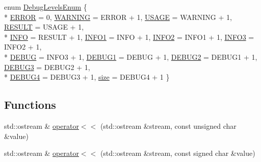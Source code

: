 \begin{DoxyCompactItemize}
\item 
enum \hyperlink{namespaceuva_1_1smt_1_1logging_ab82295a1c88a9605285d504893855427}{Debug\+Levels\+Enum} \{ \\*
\hyperlink{namespaceuva_1_1smt_1_1logging_ab82295a1c88a9605285d504893855427afe62f43ec1d0249d8c3a20e61911d469}{E\+R\+R\+O\+R} = 0, 
\hyperlink{namespaceuva_1_1smt_1_1logging_ab82295a1c88a9605285d504893855427a87b82af01a3dab361757373d1ac96254}{W\+A\+R\+N\+I\+N\+G} = E\+R\+R\+O\+R + 1, 
\hyperlink{namespaceuva_1_1smt_1_1logging_ab82295a1c88a9605285d504893855427abc4ba61d2ee3433dd43040f17603bf6a}{U\+S\+A\+G\+E} = W\+A\+R\+N\+I\+N\+G + 1, 
\hyperlink{namespaceuva_1_1smt_1_1logging_ab82295a1c88a9605285d504893855427a65835a56f97da1994648f6dbd331434c}{R\+E\+S\+U\+L\+T} = U\+S\+A\+G\+E + 1, 
\\*
\hyperlink{namespaceuva_1_1smt_1_1logging_ab82295a1c88a9605285d504893855427a4a97ea4af2faeed51be5b2d86a4dc412}{I\+N\+F\+O} = R\+E\+S\+U\+L\+T + 1, 
\hyperlink{namespaceuva_1_1smt_1_1logging_ab82295a1c88a9605285d504893855427a3b0f5996700bbed54d2955cbbf51474b}{I\+N\+F\+O1} = I\+N\+F\+O + 1, 
\hyperlink{namespaceuva_1_1smt_1_1logging_ab82295a1c88a9605285d504893855427ad9ab770ecdf8350e187499ffb78e5889}{I\+N\+F\+O2} = I\+N\+F\+O1 + 1, 
\hyperlink{namespaceuva_1_1smt_1_1logging_ab82295a1c88a9605285d504893855427ad144a114395be2fbab1842546f43838f}{I\+N\+F\+O3} = I\+N\+F\+O2 + 1, 
\\*
\hyperlink{namespaceuva_1_1smt_1_1logging_ab82295a1c88a9605285d504893855427a468f7ffe98602bcc4ac492864962db6b}{D\+E\+B\+U\+G} = I\+N\+F\+O3 + 1, 
\hyperlink{namespaceuva_1_1smt_1_1logging_ab82295a1c88a9605285d504893855427a5260d029494a201a9f18d708269383a3}{D\+E\+B\+U\+G1} = D\+E\+B\+U\+G + 1, 
\hyperlink{namespaceuva_1_1smt_1_1logging_ab82295a1c88a9605285d504893855427a57f472de9c68a00be7ff70927dce8b61}{D\+E\+B\+U\+G2} = D\+E\+B\+U\+G1 + 1, 
\hyperlink{namespaceuva_1_1smt_1_1logging_ab82295a1c88a9605285d504893855427a519f73a492f6ca4fd4aa771e5bb0d055}{D\+E\+B\+U\+G3} = D\+E\+B\+U\+G2 + 1, 
\\*
\hyperlink{namespaceuva_1_1smt_1_1logging_ab82295a1c88a9605285d504893855427a88065d5c090d82ee7f841aa4d398597d}{D\+E\+B\+U\+G4} = D\+E\+B\+U\+G3 + 1, 
\hyperlink{namespaceuva_1_1smt_1_1logging_ab82295a1c88a9605285d504893855427ab936d4b8df6cd3759aa62953806d60bf}{size} = D\+E\+B\+U\+G4 + 1
 \}
\end{DoxyCompactItemize}
\subsection*{Functions}
\begin{DoxyCompactItemize}
\item 
std\+::ostream \& \hyperlink{namespaceuva_1_1smt_1_1logging_a52925bfdd67d50636e8b6c39e42e5182}{operator$<$$<$} (std\+::ostream \&stream, const unsigned char \&value)
\item 
std\+::ostream \& \hyperlink{namespaceuva_1_1smt_1_1logging_a7cf869bb93be387339ccaff6faaf7ecf}{operator$<$$<$} (std\+::ostream \&stream, const signed char \&value)
\end{DoxyCompactItemize}
